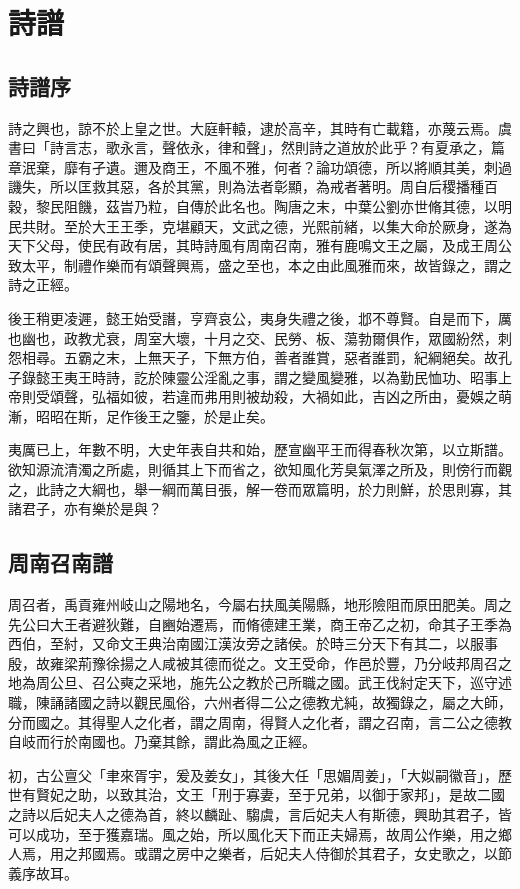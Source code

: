 \chapter{詩譜}

\section*{詩譜序}

詩之興也，諒不於上皇之世。大庭軒轅，逮於高辛，其時有亡載籍，亦蔑云焉。虞書曰「詩言志，歌永言，聲依永，律和聲」，然則詩之道放於此乎？有夏承之，篇章泯棄，靡有孑遺。邇及商王，不風不雅，何者？論功頌德，所以將順其美，刺過譏失，所以匡救其惡，各於其黨，則為法者彰顯，為戒者著明。周自后稷播種百穀，黎民阻饑，茲旹乃粒，自傳於此名也。陶唐之末，中葉公劉亦世脩其德，以明民共財。至於大王王季，克堪顧天，文武之德，光熙前緒，以集大命於厥身，遂為天下父母，使民有政有居，其時詩風有周南召南，雅有鹿鳴文王之屬，及成王周公致太平，制禮作樂而有頌聲興焉，盛之至也，本之由此風雅而來，故皆錄之，謂之詩之正經。

後王稍更凌遲，懿王始受譖，亨齊哀公，夷身失禮之後，邶不尊賢。自是而下，厲也幽也，政教尤衰，周室大壞，十月之交、民勞、板、蕩勃爾俱作，眾國紛然，刺怨相尋。五霸之末，上無天子，下無方伯，善者誰賞，惡者誰罰，紀綱絕矣。故孔子錄懿王夷王時詩，訖於陳靈公淫亂之事，謂之變風變雅，以為勤民恤功、昭事上帝則受頌聲，弘福如彼，若違而弗用則被劫殺，大禍如此，吉凶之所由，憂娛之萌漸，昭昭在斯，足作後王之鑒，於是止矣。

夷厲已上，年數不明，大史年表自共和始，歷宣幽平王而得春秋次第，以立斯譜。欲知源流清濁之所處，則循其上下而省之，欲知風化芳臭氣澤之所及，則傍行而觀之，此詩之大綱也，舉一綱而萬目張，解一卷而眾篇明，於力則鮮，於思則寡，其諸君子，亦有樂於是與？

\section*{周南召南譜}

周召者，禹貢雍州岐山之陽地名，今屬右扶風美陽縣，地形險阻而原田肥美。周之先公曰大王者避狄難，自豳始遷焉，而脩德建王業，商王帝乙之初，命其子王季為西伯，至紂，又命文王典治南國江漢汝旁之諸侯。於時三分天下有其二，以服事殷，故雍梁荊豫徐揚之人咸被其德而從之。文王受命，作邑於豐，乃分岐邦周召之地為周公旦、召公奭之采地，施先公之教於己所職之國。武王伐紂定天下，巡守述職，陳誦諸國之詩以觀民風俗，六州者得二公之德教尤純，故獨錄之，屬之大師，分而國之。其得聖人之化者，謂之周南，得賢人之化者，謂之召南，言二公之德教自岐而行於南國也。乃棄其餘，謂此為風之正經。

初，古公亶父「聿來胥宇，爰及姜女」，其後大任「思媚周姜」，「大姒嗣徽音」，歷世有賢妃之助，以致其治，文王「刑于寡妻，至于兄弟，以御于家邦」，是故二國之詩以后妃夫人之德為首，終以麟趾、騶虞，言后妃夫人有斯德，興助其君子，皆可以成功，至于獲嘉瑞。風之始，所以風化天下而正夫婦焉，故周公作樂，用之鄉人焉，用之邦國焉。或謂之房中之樂者，后妃夫人侍御於其君子，女史歌之，以節義序故耳。

